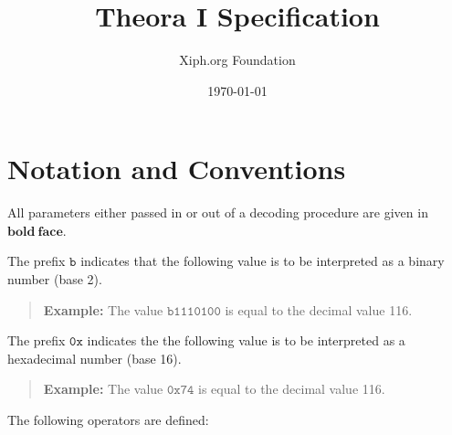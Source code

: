 \documentclass[11pt,letterpaper]{book}
\title{Theora I Specification}
\author{Xiph.org Foundation}
\date{\today}
\newcommand{\bitvar}[1]{\ensuremath{\mathbf{\bm #1}}}
\newcommand{\bin}[1]{\ensuremath{\mathtt{b#1}}}
\newcommand{\hex}[1]{\ensuremath{\mathtt{0x#1}}}
\numberwithin{equation}{chapter}
\numberwithin{figure}{chapter}
\numberwithin{table}{chapter}
\begin{document}
\frontmatter

\begin{titlepage}
\maketitle
\end{titlepage}
\thispagestyle{empty}
\cleardoublepage


\thispagestyle{plain}
\tableofcontents
\cleardoublepage
 
\thispagestyle{plain}
\listoffigures
\cleardoublepage
                                                                                
\thispagestyle{plain}
\listoftables
\cleardoublepage

\thispagestyle{plain}
\chapter*{Notation and Conventions}

All parameters either passed in or out of a decoding procedure are given in
 \bitvar{bold\ face}.

The prefix \bin{} indicates that the following value is to be interpreted as a
 binary number (base 2).
\begin{verse}
{\bf Example:} The value \bin{1110100} is equal to the decimal value 116.
\end{verse}

The prefix \hex{} indicates the the following value is to be interpreted as a
 hexadecimal number (base 16).
\begin{verse}
{\bf Example:} The value \hex{74} is equal to the decimal value 116.
\end{verse}

The following operators are defined:
\end{document}
